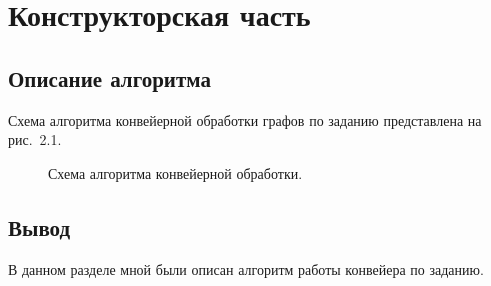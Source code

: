 \chapter{Конструкторская часть}

\section{Описание алгоритма}

Схема алгоритма конвейерной обработки графов по заданию представлена на рис.~2.1.

\begin{figure}[!htbp]
	\centering
	
	\caption{Схема алгоритма конвейерной обработки.}
\end{figure}
\FloatBarrier

\section*{Вывод}

В данном разделе мной были описан алгоритм работы конвейера по заданию.

\clearpage
